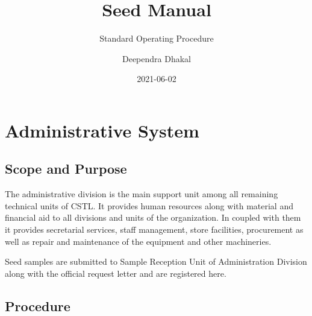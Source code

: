 \documentclass[
]{book}
\title{Seed Manual}
\subtitle{Standard Operating Procedure}
\author{Deependra Dhakal}
\date{2021-06-02}
\begin{document}
\maketitle

{
\setcounter{tocdepth}{1}
\tableofcontents
}
\hypertarget{adminsys}{%
\chapter{Administrative System}\label{adminsys}}

\hypertarget{scope-and-purpose}{%
\section{Scope and Purpose}\label{scope-and-purpose}}

The administrative division is the main support unit among all remaining technical units of CSTL. It provides human resources along with material and financial aid to all divisions and units of the organization. In coupled with them it provides secretarial services, staff management, store facilities, procurement as well as repair and maintenance of the equipment and other machineries.

Seed samples are submitted to Sample Reception Unit of Administration Division along with the official request letter and are registered here.

\hypertarget{procedure}{%
\section{Procedure}\label{procedure}}
\end{document}
